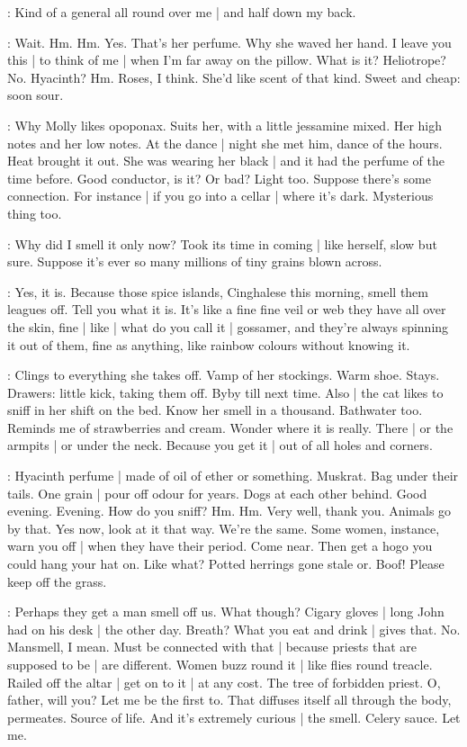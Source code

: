 \BloomCurrent:
Kind of a general all round over me |
and half down my back.

\BloomCurrent:
Wait.
Hm.
Hm.
Yes.
That's her perfume.
Why she waved her hand.
I leave you this |
to think of me |
when I'm far away on the pillow.
What is it?
Heliotrope?
No.
Hyacinth?
Hm.
Roses,
I think.
She'd like scent of that kind.
Sweet and cheap:
soon sour.%

\BloomHist:
Why Molly likes opoponax.
Suits her,
with a little jessamine mixed.
Her high notes and her low notes.
At the dance |
night she met him,
dance of the hours.
Heat brought it out.
She was wearing her black |
and it had the perfume of the time before.
Good conductor,
is it?
Or bad?
Light too.
Suppose there's some connection.
For instance |
if you go into a cellar |
where it's dark.
Mysterious thing too.

\BloomCurrent:
Why did I smell it only now?
Took its time in coming |
like herself,
slow but sure.
Suppose it's ever so many millions of tiny grains blown across.

\BloomAbstract:
Yes,
it is.
Because those spice islands,
Cinghalese this morning,
smell them leagues off.
Tell you what it is.
It's like a fine fine veil
or web they have
all over the skin,
fine |
like |
what do you call it |
gossamer,%
and they're always spinning it out of them,
fine as anything,
like rainbow colours
without knowing it.

\BloomHist:
Clings to everything she takes off.
Vamp of her stockings.
Warm shoe.
Stays.
Drawers:
little kick,
taking them off.
Byby till next time.
Also |
the cat likes to sniff in her shift
on the bed.
Know her smell in a thousand.
Bathwater too.
Reminds me of strawberries and cream.
Wonder where it is really.
There |
or the armpits |
or under the neck.
Because you get it |
out of all holes and corners.

\BloomAbstract:
Hyacinth perfume |
made of oil of ether or something.
Muskrat.
Bag under their tails.
One grain |
pour off odour for years.
Dogs at each other behind.
Good evening.
Evening.
How do you sniff?
Hm.
Hm.
Very well,
thank you.
Animals go by that.%
Yes now,
look at it that way.
We're the same.
Some women,
instance,
warn you off |
when they have their period.
Come near.
Then get a hogo you could hang your hat on.
Like what?
Potted herrings gone stale or.
Boof!
Please keep off the grass.

\BloomAbstract:
Perhaps they get a man smell off us.
What though?
Cigary gloves |
long John had on his desk |
the other day.
Breath?
What you eat and drink |
gives that.
No.
Mansmell,
I mean.
Must be connected with that |
because priests that are supposed to be |
are different.
Women buzz round it |
like flies round treacle.
Railed off the altar |
get on to it |
at any cost.
The tree of forbidden priest.
O,
father,
will you?
Let me be the first to.
That diffuses itself all through the body,
permeates.%
Source of life.
And it's extremely curious |
the smell.
Celery sauce.
Let me.

